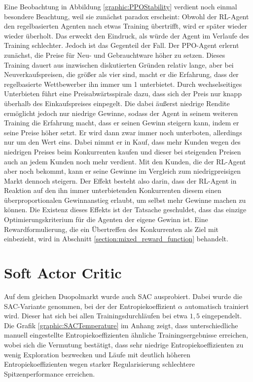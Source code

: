Eine Beobachtung in Abbildung \ref{graphic:PPOStability} verdient noch einmal besondere Beachtung, weil sie zunächst paradox erscheint:
Obwohl der RL-Agent den regelbasierten Agenten nach etwas Training übertrifft, wird er später wieder wieder überholt.
Das erweckt den Eindruck, als würde der Agent im Verlaufe des Training schlechter.
Jedoch ist das Gegenteil der Fall.
Der PPO-Agent erlernt zunächst, die Preise für Neu- und Gebrauchtware höher zu setzen.
Dieses Training dauert aus inzwischen diskutierten Gründen relativ lange, aber bei Neuverkaufspreisen, die größer als vier sind, macht er die Erfahrung, dass der regelbasierte Wettbewerber ihn immer um 1 unterbietet.
Durch wechselseitiges Unterbieten führt eine Preisabwärtsspirale dazu, dass sich der Preis nur knapp überhalb des Einkaufspreises einpegelt.
Die dabei äußerst niedrige Rendite ermöglicht jedoch nur niedrige Gewinne, sodass der Agent in seinem weiteren Training die Erfahrung macht, dass er seinen Gewinn steigern kann, indem er seine Preise höher setzt.
Er wird dann zwar immer noch unterboten, allerdings nur um den Wert eins.
Dabei nimmt er in Kauf, dass mehr Kunden wegen des niedrigen Preises beim Konkurrenten kaufen und dieser bei steigenden Preisen auch an jedem Kunden noch mehr verdient.
Mit den Kunden, die der RL-Agent aber noch bekommt, kann er seine Gewinne im Vergleich zum niedrigpreisigen Markt dennoch steigern.
Der Effekt besteht also darin, dass der RL-Agent in Reaktion auf den ihn immer unterbietenden Konkurrenten diesem einen überproportionalen Gewinnanstieg erlaubt, um selbst mehr Gewinne machen zu können.
Die Existenz dieses Effekts ist der Tatsache geschuldet, dass das einzige Optimierungskriterium für die Agenten der eigene Gewinn ist.
Eine Rewardformulierung, die ein Übertreffen des Konkurrenten als Ziel mit einbezieht, wird in Abschnitt \ref{section:mixed_reward_function} behandelt.

\section{Soft Actor Critic}
\label{section:main_sac}
Auf dem gleichen Duopolmarkt wurde auch SAC ausprobiert.
Dabei wurde die SAC-Variante genommen, bei der der Entropiekoeffizient $\alpha$ automatisch trainiert wird.
Dieser hat sich bei allen Trainingsdurchläufen bei etwa $1,5$ eingependelt.
Die Grafik \ref{graphic:SACTemperature} im Anhang zeigt, dass unterschiedliche manuell eingestellte Entropiekoeffizienten ähnliche Trainingsergebnisse erreichen, wobei sich die Vermutung bestätigt, dass sehr niedrige Entropiekoeffizienten zu wenig Exploration bezwecken und Läufe mit deutlich höheren Entropiekoeffizienten wegen starker Regularisierung schlechtere Spitzenperformance erreichen.

